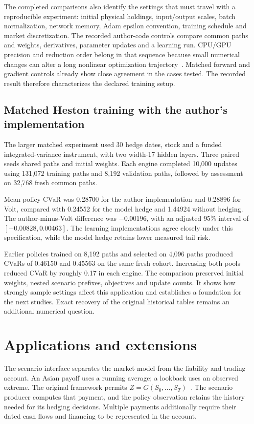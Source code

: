 \documentclass[8pt]{strategynet-journal}
\begin{document}
\begin{SNcolumns}
The completed comparisons also identify the settings that must travel with
a reproducible experiment: initial
physical holdings, input/output scales, batch normalization, network memory,
Adam epsilon convention, training schedule and market discretization.
The recorded author-code controls compare common paths and weights,
derivatives, parameter updates and a learning run.
CPU/GPU precision and reduction order belong in that sequence because small
numerical changes can alter a long nonlinear optimization trajectory~\cite{repro}.
Matched forward and gradient controls already show close agreement in the
cases tested. The recorded result therefore characterizes the declared training setup.

\subsection{Matched Heston training with the author's implementation}
The larger matched experiment used 30 hedge dates, stock and a funded
integrated-variance instrument, with two width-17 hidden layers. Three paired
seeds shared paths and initial weights. Each engine completed 10,000 updates
using 131,072 training paths and 8,192 validation paths, followed by assessment
on 32,768 fresh common paths.

Mean policy CVaR was 0.28700 for the author implementation and 0.28896 for
Volt, compared with 0.24552 for the model hedge and 1.44924 without hedging.
The author-minus-Volt difference was $-0.00196$, with an adjusted 95\% interval
of $[-0.00828,0.00463]$. The learning implementations agree closely under this
specification, while the model hedge retains lower measured tail risk.

Earlier policies trained on 8,192 paths and selected on 4,096 paths produced
CVaRs of 0.46150 and 0.45563 on the same fresh cohort. Increasing both pools
reduced CVaR by roughly 0.17 in each engine. The comparison preserved initial
weights, nested scenario prefixes, objectives and update counts. It shows how
strongly sample settings affect this application and establishes a foundation
for the next studies. Exact recovery of the original historical tables remains
an additional numerical question.

\section{Applications and extensions}
The scenario interface separates the market model from the liability and
trading account. An Asian payoff uses a running average; a lookback uses an
observed extreme. The original framework permits
$Z=G(S_0,\ldots,S_T)$~\cite{deephedging}. The scenario producer computes that
payment, and the policy observation retains the history needed for its
hedging decisions. Multiple payments additionally require their dated cash
flows and financing to be represented in the account.


\end{SNcolumns}
\end{document}
